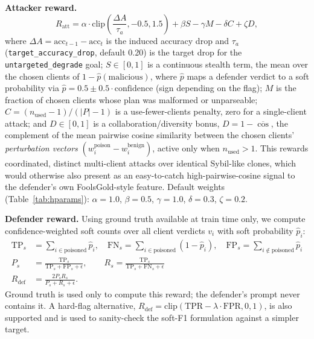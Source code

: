 \documentclass[conference]{IEEEtran}
\begin{document}
\textbf{Attacker reward.}
\begin{equation}
R_{\mathrm{att}} = \alpha \cdot \mathrm{clip}\!\left(\frac{\Delta A}{\tau_a}, -0.5, 1.5\right) + \beta S - \gamma M - \delta C + \zeta D,
\label{eq:attacker_reward}
\end{equation}
where $\Delta A = \mathrm{acc}_{t-1} - \mathrm{acc}_t$ is the induced accuracy drop and $\tau_a$ (\texttt{target\_accuracy\_drop}, default 0.20) is the target drop for the \texttt{untargeted\_degrade} goal; $S \in [0,1]$ is a continuous stealth term, the mean over the chosen clients of $1-\hat p(\mathrm{malicious})$, where $\hat p$ maps a defender verdict to a soft probability via $\hat p = 0.5 \pm 0.5\cdot\mathrm{confidence}$ (sign depending on the flag); $M$ is the fraction of chosen clients whose plan was malformed or unparseable; $C=(n_{\mathrm{used}}-1)/(|P|-1)$ is a use-fewer-clients penalty, zero for a single-client attack; and $D\in[0,1]$ is a collaboration/diversity bonus, $D = 1 - \overline{\cos}$, the complement of the mean pairwise cosine similarity between the chosen clients' \emph{perturbation vectors} $(w^{\text{poison}}_i - w^{\text{benign}}_i)$, active only when $n_{\mathrm{used}}>1$. This rewards coordinated, distinct multi-client attacks over identical Sybil-like clones, which would otherwise also present as an easy-to-catch high-pairwise-cosine signal to the defender's own FoolsGold-style feature. Default weights (Table~\ref{tab:hparams}): $\alpha{=}1.0$, $\beta{=}0.5$, $\gamma{=}1.0$, $\delta{=}0.3$, $\zeta{=}0.2$.

\textbf{Defender reward.} Using ground truth available at train time only, we compute confidence-weighted soft counts over all client verdicts $v_i$ with soft probability $\hat p_i$:
\begin{align}
\mathrm{TP}_s &= \!\!\sum_{i \in \text{poisoned}}\!\! \hat p_i, \quad
\mathrm{FN}_s = \!\!\sum_{i \in \text{poisoned}}\!\! (1-\hat p_i), \quad
\mathrm{FP}_s = \!\!\sum_{i \notin \text{poisoned}}\!\! \hat p_i \\
P_s &= \frac{\mathrm{TP}_s}{\mathrm{TP}_s+\mathrm{FP}_s+\epsilon}, \qquad
R_s = \frac{\mathrm{TP}_s}{\mathrm{TP}_s+\mathrm{FN}_s+\epsilon} \\
R_{\mathrm{def}} &= \frac{2P_sR_s}{P_s+R_s+\epsilon}.
\label{eq:soft_f1}
\end{align}
Ground truth is used only to compute this reward; the defender's prompt never contains it. A hard-flag alternative, $R_{\mathrm{def}} = \mathrm{clip}(\mathrm{TPR} - \lambda\cdot\mathrm{FPR}, 0, 1)$, is also supported and is used to sanity-check the soft-F1 formulation against a simpler target.
\end{document}
